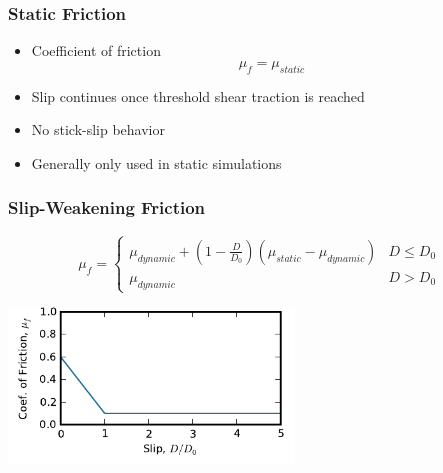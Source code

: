 \documentclass[aspectratio=169]{beamer}
\begin{document}
\begin{frame}
  \frametitle{Static Friction}

  \begin{itemize}
  \item Coefficient of friction
    \begin{equation}
      \mu_f = \mu_\mathit{static}
    \end{equation}
  \item Slip continues once threshold shear traction is reached
  \item No stick-slip behavior
  \item Generally only used in static simulations
  \end{itemize}
  
\end{frame}


\begin{frame}
  \frametitle{Slip-Weakening Friction}

  \begin{equation}
    \mu_f = \left\{ \begin{array}{ll}
        \mu_\mathit{dynamic} + (1 - \frac{D}{D_0})
        (\mu_\mathit{static} -\mu_\mathit{dynamic}) & D \leq D_0 \\
        \mu_\mathit{dynamic} & D > D_0
      \end{array} \right.
  \end{equation}
  \begin{center}
    \includegraphics[height=1.65in]{figs/friction_slipweak}
  \end{center}
  
\end{frame}
\end{document}

